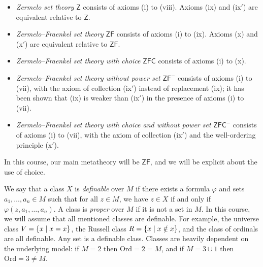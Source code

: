 \begin{itemize}
    \item \emph{Zermelo set theory} \( \mathsf{Z} \) consists of axioms (i) to (viii).
    Axioms (ix) and (ix\('\)) are equivalent relative to \( \mathsf{Z} \).
    \item \emph{Zermelo--Fraenkel set theory} \( \mathsf{ZF} \) consists of axioms (i) to (ix).
    Axioms (x) and (x\('\)) are equivalent relative to \( \mathsf{ZF} \).
    \item \emph{Zermelo--Fraenkel set theory with choice} \( \mathsf{ZFC} \) consists of axioms (i) to (x).
    \item \emph{Zermelo--Fraenkel set theory without power set} \( \mathsf{ZF}^- \) consists of axioms (i) to (vii), with the axiom of collection (ix\('\)) instead of replacement (ix); it has been shown that (ix) is weaker than (ix\('\)) in the presence of axioms (i) to (vii).
    \item \emph{Zermelo--Fraenkel set theory with choice and without power set} \( \mathsf{ZFC}^- \) consists of axioms (i) to (vii), with the axiom of collection (ix\('\)) and the well-ordering principle (x\('\)).
\end{itemize}
In this course, our main metatheory will be \( \mathsf{ZF} \), and we will be explicit about the use of choice.

We say that a class \( X \) is \emph{definable} over \( M \) if there exists a formula \( \varphi \) and sets \( a_1, \dots, a_n \in M \) such that for all \( z \in M \), we have \( z \in X \) if and only if \( \varphi(z, a_1, \dots, a_n) \).
A class is \emph{proper} over \( M \) if it is not a set in \( M \).
In this course, we will assume that all mentioned classes are definable.
For example, the universe class \( V = \qty{x \mid x = x} \), the Russell class \( R = \qty{x \mid x \notin x} \), and the class of ordinals are all definable.
Any set is a definable class.
Classes are heavily dependent on the underlying model: if \( M = 2 \) then \( \mathrm{Ord} = 2 = M \), and if \( M = 3 \cup \qty{1} \) then \( \mathrm{Ord} = 3 \neq M \).

